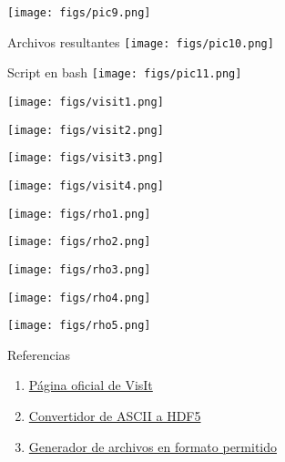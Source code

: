\documentclass[utf8]{beamer}
\begin{document}
\begin{frame}{}
	\centering
	\texttt{[image: figs/pic9.png]}
\end{frame}

\begin{frame}{Archivos resultantes}
	\centering
	\texttt{[image: figs/pic10.png]}
\end{frame}

\begin{frame}{Script en bash}
	\centering
	\texttt{[image: figs/pic11.png]}
\end{frame}

\begin{frame}{}
	\centering
	\texttt{[image: figs/visit1.png]}
\end{frame}

\begin{frame}{}
	\centering
	\texttt{[image: figs/visit2.png]}
\end{frame}

\begin{frame}{}
	\centering
	\texttt{[image: figs/visit3.png]}
\end{frame}

\begin{frame}{}
	\centering
	\texttt{[image: figs/visit4.png]}
\end{frame}

\begin{frame}{}
	\centering
	\texttt{[image: figs/rho1.png]}
\end{frame}

\begin{frame}{}
	\centering
	\texttt{[image: figs/rho2.png]}
\end{frame}

\begin{frame}{}
	\centering
	\texttt{[image: figs/rho3.png]}
\end{frame}

\begin{frame}{}
	\centering
	\texttt{[image: figs/rho4.png]}
\end{frame}

\begin{frame}{}
	\centering
	\texttt{[image: figs/rho5.png]}
\end{frame}

\begin{frame}{Referencias}
	\begin{enumerate}
		\item \href{https://wci.llnl.gov/simulation/computer-codes/visit/}{Página oficial de VisIt}
		\item \href{https://github.com/philrosenfield/ascii2hdf5}{Convertidor de ASCII a HDF5}
		\item \href{https://www.visitusers.org/index.php?title=Reading_point_data}{Generador de archivos en formato permitido}
	\end{enumerate}

\end{frame}
\end{document}
